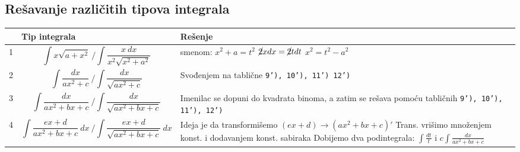 \documentclass{article}
\begin{document}
\newpage

\subsection{Rešavanje različitih tipova integrala}
\setlength{\abovedisplayskip}{0pt}
\setlength{\belowdisplayskip}{0pt}
\setlength{\mathindent}{0.0pt}

	   \begin{tabular}{|I{0.5cm}|p{7.5cm}|R{10cm}|}
		\hline
		   \textbf{} & \textbf{Tip integrala} & \textbf{Rešenje} \\

		\hline
		   \vspace{2mm} 1 & \[\int{x\sqrt{a + x^2}}\ \Big/\int{\frac{x \ dx}{x^2\sqrt{x^2+a^2}}}\] & smenom: $x^2 + a = t^2$ \newline $\cancel{2}xdx = \cancel{2}tdt$ \newline $x^2 = t^2 - a^2$ \\
				\hline
		   \vspace{2mm} 2 & \[\int{\frac{dx}{ax^2+c}}\ \Big/ \int{\frac{dx}{\sqrt{ax^2+c}}} \] & Svođenjem na tablične \texttt{9'), 10'), 11') 12')}  \\
		\hline
		   \vspace{2mm} 3  & \[ \int\frac{dx}{ax^2+bx +c}\ \Big/ \int{\frac{dx}{\sqrt{ax^2+bx+c}}} \] & Imenilac se dopuni do kvadrata binoma, a zatim se rešava pomoću tabličnih \texttt{9'), 10'), 11'), 12')}  \\
		\hline
		   \vspace{3mm} 4 & \[\int{\frac{ex+d}{ax^2+bx+c}\ dx}\ \Big/ \int{\frac{ex+d}{\sqrt{ax^2+bx+c}}\ dx}\]  & Ideja je da transformišemo $(ex+d) \rightarrow (ax^2+bx+c)'$ \newline Trans. vrišimo množenjem konst. i dodavanjem konst. sabiraka \newline Dobijemo dva podintegrala: $\int{\frac{dt}{t}}$ i $c\int{\frac{dx}{ax^2+bx+c}}$ \\
		\hline
		

\end{tabular}
\end{document}
